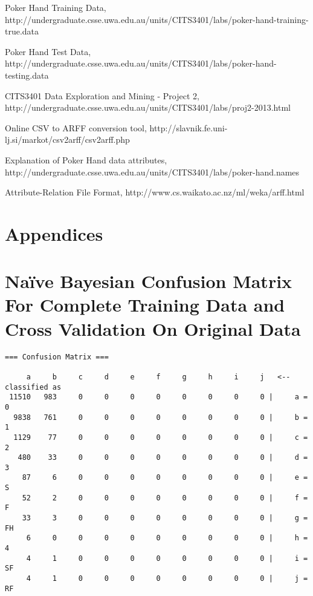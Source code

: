 \documentclass[11pt, a4paper]{article}
\begin{document}
\begin{thebibliography}{9}

	Poker Hand Training Data,	
	http://undergraduate.csse.uwa.edu.au/units/CITS3401/labs/poker-hand-training-true.data
	
	Poker Hand Test Data,	
	http://undergraduate.csse.uwa.edu.au/units/CITS3401/labs/poker-hand-testing.data
	
	CITS3401 Data Exploration and Mining - Project 2,
	http://undergraduate.csse.uwa.edu.au/units/CITS3401/labs/proj2-2013.html

	Online CSV to ARFF conversion tool,
	http://slavnik.fe.uni-lj.si/markot/csv2arff/csv2arff.php

	Explanation of Poker Hand data attributes,
	http://undergraduate.csse.uwa.edu.au/units/CITS3401/labs/poker-hand.names

	Attribute-Relation File Format,
	http://www.cs.waikato.ac.nz/ml/weka/arff.html

\end{thebibliography}



\appendix

\section*{Appendices}

\section{Na\"ive Bayesian Confusion Matrix For Complete Training Data and Cross Validation On Original Data}

\begin{verbatim}
=== Confusion Matrix ===

     a     b     c     d     e     f     g     h     i     j   <-- classified as
 11510   983     0     0     0     0     0     0     0     0 |     a = 0
  9838   761     0     0     0     0     0     0     0     0 |     b = 1
  1129    77     0     0     0     0     0     0     0     0 |     c = 2
   480    33     0     0     0     0     0     0     0     0 |     d = 3
    87     6     0     0     0     0     0     0     0     0 |     e = S
    52     2     0     0     0     0     0     0     0     0 |     f = F
    33     3     0     0     0     0     0     0     0     0 |     g = FH
     6     0     0     0     0     0     0     0     0     0 |     h = 4
     4     1     0     0     0     0     0     0     0     0 |     i = SF
     4     1     0     0     0     0     0     0     0     0 |     j = RF
\end{verbatim}
\end{document}
